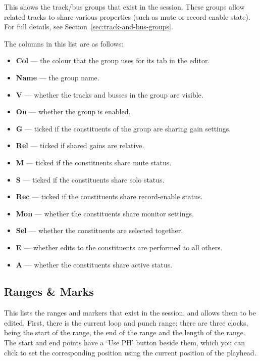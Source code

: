 \documentclass[10pt,a4paper]{book}
\begin{document}
{This shows the track/bus groups that exist in the session.  These
groups allow related tracks to share various properties (such as mute
or record enable state).  For full details, see
Section~\ref{sec:track-and-bus-groups}.

The columns in this list are as follows:

\begin{itemize}
\item \textbf{Col} --- the colour that the group uses for its tab in
  the editor.
\item \textbf{Name} --- the group name.
\item \textbf{V} --- whether the tracks and busses in the group are visible.
\item \textbf{On} --- whether the group is enabled.
\item \textbf{G} --- ticked if the constituents of the group are sharing gain settings.
\item \textbf{Rel} --- ticked if shared gains are relative.
\item \textbf{M} --- ticked if the constituents share mute status.
\item \textbf{S} --- ticked if the constituents share solo status.
\item \textbf{Rec} --- ticked if the constituents share record-enable status.
\item \textbf{Mon} --- whether the constituents share monitor settings.
\item \textbf{Sel} --- whether the constituents are selected together.
\item \textbf{E} --- whether edits to the constituents are performed to all others.
\item \textbf{A} --- whether the constituents share active status.
\end{itemize}

\subsection{Ranges \& Marks}

This lists the ranges and markers that exist in the session, and
allows them to be edited.  First, there is the current loop and punch
range; there are three clocks, being the start of the range, the end
of the range and the length of the range.  The start and end points
have a `Use PH' button beside them, which you can click to set the
corresponding position using the current position of the playhead.

}
\end{document}
